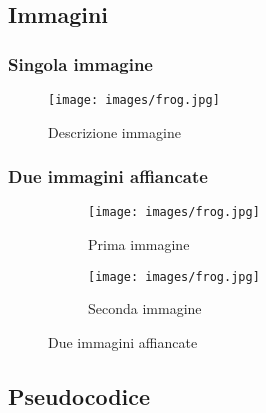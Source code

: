 \subsection*{Immagini}

\subsubsection*{Singola immagine}
\begin{figure}[H] %
    \centering
    \texttt{[image: images/frog.jpg]}
    \caption{Descrizione immagine}
    \label{fig:label-immagine.}
\end{figure}

\subsubsection*{Due immagini affiancate}
\begin{figure}[H]
    \centering
    \begin{subfigure}[b]{0.45\textwidth}
        \centering
        \texttt{[image: images/frog.jpg]}
        \caption{Prima immagine}
        \label{fig:prima}
    \end{subfigure}
    \hfill
    \begin{subfigure}[b]{0.45\textwidth}
        \centering
        \texttt{[image: images/frog.jpg]}
        \caption{Seconda immagine}
        \label{fig:seconda}
    \end{subfigure}
    \caption{Due immagini affiancate}
    \label{fig:due_immagini}
\end{figure}

\subsection*{Pseudocodice}

